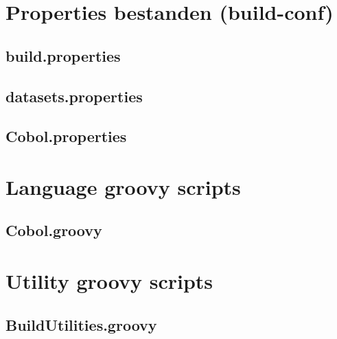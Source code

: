 \documentclass[dutch,dit,thesis]{hogentreport}
\begin{document}

\chapter{Properties bestanden (build-conf)}
\label{ch:appropsbuild}
\section{build.properties}
\label{sec:buildprops}


\pagebreak
\section{datasets.properties}
\label{sec:dataprops}


\pagebreak
\section{Cobol.properties}
\label{sec:cobpropsbuild}


\chapter{Language groovy scripts}
\label{ch:aplangroovy}
\section{Cobol.groovy}
\label{sec:cobgroovy}



\chapter{Utility groovy scripts}
\label{ch:aputilgroovy}
\section{BuildUtilities.groovy}
\label{sec:buildutilgroovy}

\end{document}
